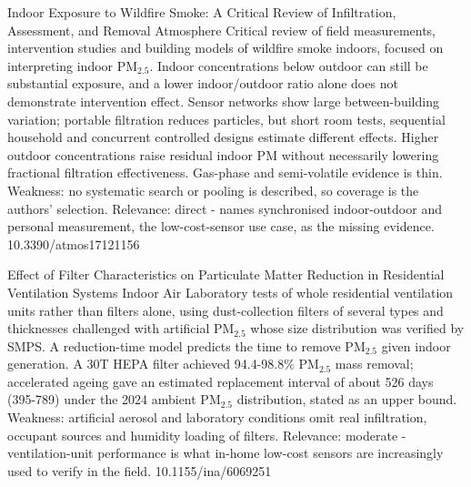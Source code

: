\documentclass[10pt]{article}
\begin{document}
{Indoor Exposure to Wildfire Smoke: A Critical Review of Infiltration, Assessment, and Removal}
{Atmosphere}
{Critical review of field measurements, intervention studies and building models of wildfire smoke indoors, focused on interpreting indoor PM$_{2.5}$. Indoor concentrations below outdoor can still be substantial exposure, and a lower indoor/outdoor ratio alone does not demonstrate intervention effect. Sensor networks show large between-building variation; portable filtration reduces particles, but short room tests, sequential household and concurrent controlled designs estimate different effects. Higher outdoor concentrations raise residual indoor PM without necessarily lowering fractional filtration effectiveness. Gas-phase and semi-volatile evidence is thin. Weakness: no systematic search or pooling is described, so coverage is the authors' selection. Relevance: direct - names synchronised indoor-outdoor and personal measurement, the low-cost-sensor use case, as the missing evidence.}
{10.3390/atmos17121156}

{Effect of Filter Characteristics on Particulate Matter Reduction in Residential Ventilation Systems}
{Indoor Air}
{Laboratory tests of whole residential ventilation units rather than filters alone, using dust-collection filters of several types and thicknesses challenged with artificial PM$_{2.5}$ whose size distribution was verified by SMPS. A reduction-time model predicts the time to remove PM$_{2.5}$ given indoor generation. A 30T HEPA filter achieved 94.4-98.8\% PM$_{2.5}$ mass removal; accelerated ageing gave an estimated replacement interval of about 526 days (395-789) under the 2024 ambient PM$_{2.5}$ distribution, stated as an upper bound. Weakness: artificial aerosol and laboratory conditions omit real infiltration, occupant sources and humidity loading of filters. Relevance: moderate - ventilation-unit performance is what in-home low-cost sensors are increasingly used to verify in the field.}
{10.1155/ina/6069251}

\par{}\baselineskip{}\baselineskip
{}
\end{document}
